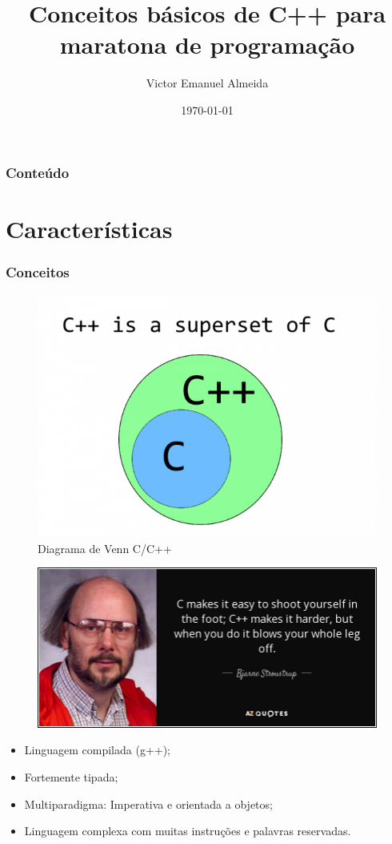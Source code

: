 \documentclass[12pt]{beamer}
\author{Victor Emanuel Almeida}
\title{Conceitos básicos de C++ para maratona de programação}
\date{\today}
\institute{UNIOESTE}
\begin{document}
\frame{\titlepage}

\begin{frame}
    \frametitle{Conteúdo}
    \tableofcontents
\end{frame}

\section{Características}\label{Características}
\begin{frame}[allowframebreaks]
    \frametitle{Conceitos}
    \begin{figure}[!htb]
        \centering
        \includegraphics[width=.7\textwidth]{superset}
        \caption{\label{fig:superset}Diagrama de Venn C/C++}
    \end{figure}
    \framebreak
    \begin{figure}[!htb]
        \centering
        \includegraphics[width=\textwidth]{frase_c++}
    \end{figure}
    \framebreak
    \begin{itemize}
        \item Linguagem compilada (g++);
        \item Fortemente tipada\cite{slides_clp_2};
        \item Multiparadigma: Imperativa e orientada a objetos\cite{slides_clp_2};
        \item Linguagem complexa com muitas instruções e palavras reservadas\cite{slides_clp_2}.
    \end{itemize}
\end{frame}
\end{document}
